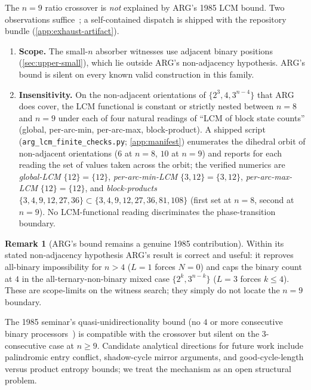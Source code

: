 \documentclass[11pt,a4paper]{article}
\theoremstyle{plain}
\theoremstyle{definition}
\newtheorem{remark}[theorem]{Remark}
\begin{document}
The $n = 9$ ratio crossover is \emph{not} explained by ARG's 1985
LCM bound.  Two observations
suffice~\cite[\S2--\S3]{HaddadKnuth1985}; a self-contained dispatch
is shipped with the repository bundle
(\cref{app:exhaust-artifact}).
\begin{enumerate}[leftmargin=*]
\item \textbf{Scope.} The small-$n$ absorber witnesses use adjacent
binary positions (\cref{sec:upper-small}), which lie outside ARG's
non-adjacency hypothesis.  ARG's bound is silent on every known valid
construction in this family.
\item \textbf{Insensitivity.} On the non-adjacent orientations of
$\{2^3, 4, 3^{n-4}\}$ that ARG does cover, the LCM functional is
constant or strictly nested between $n = 8$ and $n = 9$ under each of
four natural readings of ``LCM of block state counts'' (global,
per-arc-min, per-arc-max, block-product).  A shipped script (\texttt{arg\_lcm\_finite\_checks.py};
\cref{app:manifest}) enumerates the dihedral orbit of non-adjacent
orientations ($6$ at
$n = 8$, $10$ at $n = 9$) and reports for each reading the set of
values taken across the orbit; the verified numerics are
\emph{global-LCM} $\{12\} = \{12\}$, \emph{per-arc-min-LCM}
$\{3, 12\} = \{3, 12\}$, \emph{per-arc-max-LCM} $\{12\} = \{12\}$,
and \emph{block-products} $\{3, 4, 9, 12, 27, 36\} \subset \{3, 4, 9,
12, 27, 36, 81, 108\}$ (first set at $n = 8$, second at $n = 9$).  No
LCM-functional reading discriminates the phase-transition boundary.
\end{enumerate}

\begin{remark}[ARG's bound remains a genuine 1985 contribution]\label{rem:arg-not-wrong}
Within its stated non-adjacency hypothesis ARG's result is correct and
useful: it reproves all-binary impossibility for $n > 4$
($L = 1$ forces $N = 0$) and caps the binary count at $4$ in the
all-ternary-non-binary mixed case $\{2^k, 3^{n-k}\}$ ($L = 3$ forces
$k \le 4$).  These are scope-limits on the witness search; they
simply do not locate the $n = 9$ boundary.
\end{remark}

The 1985 seminar's quasi-unidirectionality bound (no $4$ or more
consecutive binary processors~\cite[p.~75]{HaddadKnuth1985}) is
compatible with the crossover but silent on the $3$-consecutive case
at $n \ge 9$.  Candidate analytical directions for future work include
palindromic entry conflict, shadow-cycle mirror arguments, and
good-cycle-length versus product entropy bounds; we treat the mechanism
as an open structural problem.
\end{document}
